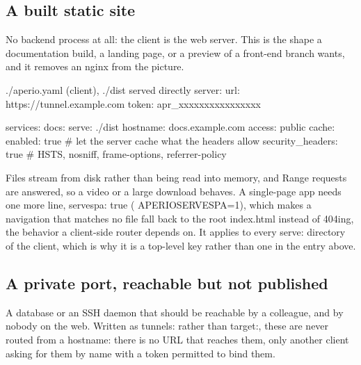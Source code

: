 \documentclass[11pt,a4paper,oneside]{book}
\newcommand{\aperiobreakableunderscore}{\textunderscore\allowbreak}
\newcommand{\aperiocodebreaks}{\XeTeXinterchartokenstate=1 }
\newcommand{\aperiocodebreaks}{}
\DeclareRobustCommand{\code}[1]{{\ttfamily\small\aperiocodebreaks
  \let\_\aperiobreakableunderscore#1}}
\begin{document}
\subsection{A built static site}

No backend process at all: the client is the web server. This is the
shape a documentation build, a landing page, or a preview of a front-end
branch wants, and it removes an nginx from the picture.

\begin{codecard}[aperioyaml]{./aperio.yaml (client), ./dist served directly}
server:
  url: https://tunnel.example.com
  token: apr_xxxxxxxxxxxxxxxx

services:
  docs:
    serve: ./dist
    hostname: docs.example.com
    access: public
    cache:
      enabled: true             # let the server cache what the headers allow
    security_headers: true      # HSTS, nosniff, frame-options, referrer-policy
\end{codecard}

Files stream from disk rather than being read into memory, and \code{Range}
requests are answered, so a video or a large download behaves. A
single-page app needs one more line, \code{serve\_spa: true}
(\code{APERIO\_SERVE\_SPA=1}), which makes a navigation that matches no
file fall back to the root \code{index.html} instead of \code{404}ing,
the behavior a client-side router depends on. It applies to every
\code{serve:} directory of the client, which is why it is a top-level key
rather than one in the entry above.

\subsection{A private port, reachable but not published}

A database or an SSH daemon that should be reachable by a colleague, and
by nobody on the web. Written as \code{tunnels:} rather than
\code{target:}, these are never routed from a hostname: there is no URL
that reaches them, only another client asking for them by name with a
token permitted to bind them.

\end{document}
